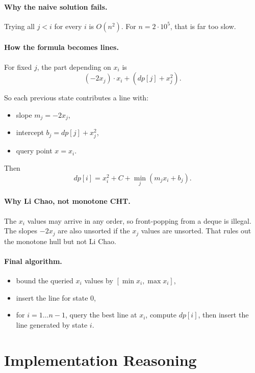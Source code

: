 \paragraph{Why the naive solution fails.}
Trying all \(j < i\) for every \(i\) is \(O(n^2)\). For \(n = 2 \cdot 10^5\), that is far too slow.

\paragraph{How the formula becomes lines.}
For fixed \(j\), the part depending on \(x_i\) is
\[
(-2x_j)\cdot x_i + (dp[j] + x_j^2).
\]

So each previous state contributes a line with:

\begin{itemize}
  \item slope \(m_j = -2x_j\),
  \item intercept \(b_j = dp[j] + x_j^2\),
  \item query point \(x = x_i\).
\end{itemize}

Then
\[
dp[i] = x_i^2 + C + \min_j (m_j x_i + b_j).
\]

\paragraph{Why Li Chao, not monotone CHT.}
The \(x_i\) values may arrive in any order, so front-popping from a deque is illegal. The slopes
\(-2x_j\) are also unsorted if the \(x_j\) values are unsorted. That rules out the monotone hull but not Li Chao.

\paragraph{Final algorithm.}

\begin{itemize}
  \item bound the queried \(x_i\) values by \([\min x_i, \max x_i]\),
  \item insert the line for state \(0\),
  \item for \(i = 1 \ldots n-1\), query the best line at \(x_i\), compute \(dp[i]\), then insert the line generated by
  state \(i\).
\end{itemize}

\section*{Implementation Reasoning}

